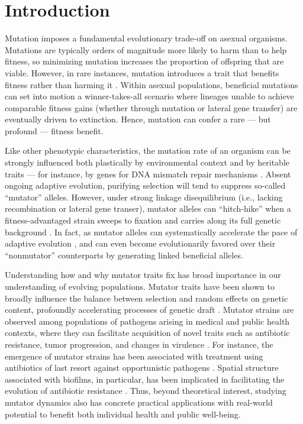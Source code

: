 \section{Introduction} \label{sec:introduction}

Mutation imposes a fundamental evolutionary trade-off on asexual organisms.
Mutations are typically orders of magnitude more likely to harm than to help fitness, so minimizing mutation increases the proportion of offspring that are viable.
However, in rare instances, mutation introduces a trait that benefits fitness rather than harming it \citep{zeyl2004capturing,rozen2002fitness}.
Within asexual populations, beneficial mutations can set into motion a winner-takes-all scenario where lineages unable to achieve comparable fitness gains (whether through mutation or lateral gene transfer) are eventually driven to extinction.
Hence, mutation can confer a rare --- but profound --- fitness benefit.

Like other phenotypic characteristics, the mutation rate of an organism can be strongly influenced both plastically by environmental context \citep{ram2012evolution} and by heritable traits --- for instance, by genes for DNA mismatch repair mechanisms \citep{miller1998mutators}.
Absent ongoing adaptive evolution, purifying selection will tend to suppress so-called ``mutator'' alleles.
However, under strong linkage disequilibrium (i.e., lacking recombination or lateral gene transer), mutator alleles can  ``hitch-hike'' when a fitness-advantaged strain sweeps to fixation and carries along its full genetic background \citep{smith1974hitchhiking,johnson1999beneficial,gentile2011competition}.
In fact, as mutator alleles can systematically accelerate the pace of adaptive evolution \citep{orr2000rate}, and can even become evolutionarily favored over their ``nonmutator'' counterparts by generating linked beneficial alleles.

Understanding how and why mutator traits fix has broad importance in our understanding of evolving populations.
Mutator traits have been shown to broadly influence the balance between selection and random effects on genetic content, profoundly accelerating processes of genetic draft \citep{couce2017mutator}.
Mutator strains are observed among populations of pathogens arising in medical and public health contexts, where they can facilitate acquisition of novel traits such as antibiotic resistance, tumor progression, and changes in virulence \citep{eliopoulos2003hypermutation,jolivetgougeon2011bacterial,stern2016viral,schlesner2015hypermutation,hammerstrom2015acinetobacter,perron2010hypermutability}.
For instance, the emergence of mutator strains has been associated with treatment using antibiotics of last resort against opportunistic pathogens \citep{mehta2019essential}.
Spatial structure associated with biofilms, in particular, has been implicated in facilitating the evolution of antibiotic resistance \citep{france2018spatial}.
Thus, beyond theoretical interest, studying mutator dynamics also has concrete practical applications with real-world potential to benefit both individual health and public well-being.

